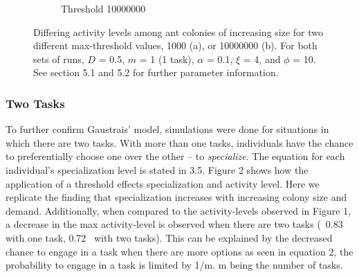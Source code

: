 \documentclass[a4paper]{article}
\begin{document}
\begin{figure}[!ht]
\begin{subfigure}[b]{0.45\linewidth}
		\caption{Threshold 10000000}\label{fig:1b}
	\end{subfigure}
	\caption{Differing activity levels among ant colonies of increasing size for two different max-threshold values, 1000 (a), or 10000000 (b). For both sets of runs, $D$ = 0.5, $m$ = 1 (1 task), $\alpha$ = 0.1, $\xi$ = 4, and $\phi$ = 10.  See section 5.1 and 5.2 for further parameter information.}\label{fig:1}
\end{figure}



\subsubsection {Two Tasks}

To further confirm Gaustrais’ model, simulations were done for situations in which there are two tasks. With more than one tasks, individuals have the chance to preferentially choose one over the other – to \textit{specialize}. The equation for each individual’s specialization level is stated in 3.5. Figure 2 shows how the application of a threshold effects specialization and activity level. Here we replicate the finding that specialization increases with increasing colony size and demand. Additionally, when compared to the activity-levels observed in Figure 1, a decrease in the max activity-level is observed when there are two tasks (~0.83 with one task, 0.72~ with two tasks). This can be explained by the decreased chance to engage in a task when there are more options as seen in equation 2, the probability to engage in a task is limited by 1/m. m being the number of tasks. 
\end{document}
